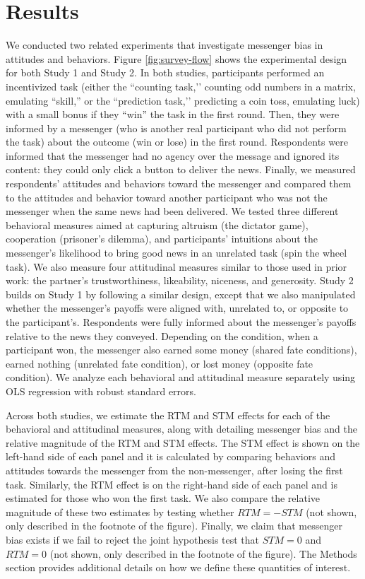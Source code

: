 \section{Results}



We conducted two related experiments that investigate messenger bias
in attitudes and behaviors. Figure \ref{fig:survey-flow} shows the experimental design for
both Study 1 and Study 2. In both studies, participants performed an
incentivized task (either the ``counting task,’’ counting odd numbers in a matrix, emulating ``skill,'' or the ``prediction task,’’ predicting a coin toss, emulating luck) with a
small bonus if they ``win'' the task in the first round. Then, they
were informed by a messenger (who is another real participant who did
not perform the task) about the outcome (win or lose) in the first
round. Respondents were informed that the messenger had no agency over the
message and ignored its content: they could only click a button to
deliver the news. Finally, we measured respondents' attitudes and
behaviors toward the messenger and compared them to the attitudes and
behavior toward another participant who was not the messenger when the
same news had been delivered. We tested three different behavioral
measures aimed at capturing altruism (the dictator game), cooperation
(prisoner's dilemma), and participants' intuitions about the messenger's
likelihood to bring good news in an unrelated task (spin the wheel
task). We also measure four attitudinal measures similar to those used
in prior work: the partner's trustworthiness, likeability, niceness, and
generosity. Study 2 builds on Study 1 by following a similar design,
except that we also manipulated whether the messenger's payoffs were
aligned with, unrelated to, or opposite to the participant's. Respondents
were fully informed about the messenger's payoffs relative to the news
they conveyed. Depending on the condition, when a participant won, the
messenger also earned some money (shared fate conditions), earned
nothing (unrelated fate condition), or lost money (opposite fate
condition). We analyze each behavioral and attitudinal measure
separately using OLS regression with robust standard errors.

Across both studies, we estimate the RTM and STM effects for each of the behavioral and attitudinal
measures, along with detailing messenger bias and the relative magnitude
of the RTM and STM effects. The STM effect is shown on the left-hand side of each panel and it is calculated by comparing behaviors and attitudes towards the messenger from the non-messenger, after losing the first task. 
Similarly, the RTM effect is on the right-hand side of each panel and is estimated for those who won the first task.
We also compare the relative magnitude of these two estimates by testing
whether $RTM = -STM$ (not shown, only described in the footnote of
the figure). Finally, we claim that messenger bias exists if we fail to
reject the joint hypothesis test that $STM = 0$ and $RTM = 0$ (not
shown, only described in the footnote of the figure). The Methods section
provides additional details on how we define these quantities of
interest.

